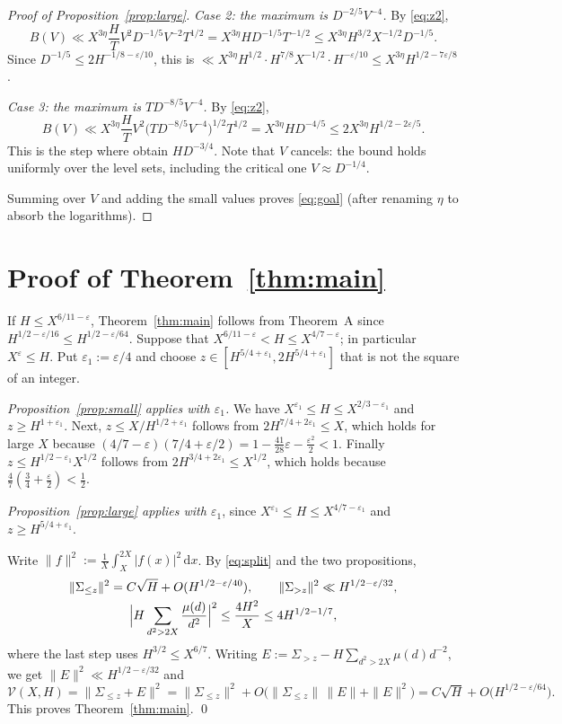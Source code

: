 \documentclass[11pt]{amsart}
\theoremstyle{remark}
\newcommand{\eps}{\varepsilon}
\newcommand{\dd}{\,\mathrm{d}}
\begin{document}
\begin{proof}[Proof of Proposition~\ref{prop:large}]
\emph{Case 2: the maximum is $D^{-2/5}V^{-4}$.}  By \eqref{eq:z2},
\[
  B(V)\ll X^{3\eta}\frac HT V^2D^{-1/5}V^{-2}T^{1/2}=X^{3\eta}HD^{-1/5}T^{-1/2}
  \le X^{3\eta}H^{3/2}X^{-1/2}D^{-1/5}.
\]
Since $D^{-1/5}\le2H^{-1/8-\eps/10}$, this is
$\ll X^{3\eta}H^{1/2}\cdot H^{7/8}X^{-1/2}\cdot H^{-\eps/10}\le X^{3\eta}H^{1/2-7\eps/8}$.

\emph{Case 3: the maximum is $TD^{-8/5}V^{-4}$.}  By \eqref{eq:z2},
\[
  B(V)\ll X^{3\eta}\frac HTV^2\bigl(TD^{-8/5}V^{-4}\bigr)^{1/2}T^{1/2}=X^{3\eta}HD^{-4/5}\le 2X^{3\eta}H^{1/2-2\eps/5}.
\]
This is the step where \cite{GMRR} obtain $HD^{-3/4}$.  Note that $V$ cancels:
the bound holds uniformly over the level sets, including the critical one
$V\approx D^{-1/4}$.

Summing over $V$ and adding the small values proves \eqref{eq:goal} (after
renaming $\eta$ to absorb the logarithms).
\end{proof}

\section{Proof of Theorem~\ref{thm:main}}

If $H\le X^{6/11-\eps}$, Theorem~\ref{thm:main} follows from Theorem~A since
$H^{1/2-\eps/16}\le H^{1/2-\eps/64}$.  Suppose that
$X^{6/11-\eps}<H\le X^{4/7-\eps}$; in particular $X^{\eps}\le H$.  Put $\eps_1:=\eps/4$
and choose $z\in[H^{5/4+\eps_1},2H^{5/4+\eps_1}]$ that is not the square of an integer.

\emph{Proposition~\ref{prop:small} applies with $\eps_1$.}  We have $X^{\eps_1}\le H\le X^{2/3-\eps_1}$
and $z\ge H^{1+\eps_1}$.  Next, $z\le X/H^{1/2+\eps_1}$ follows from
$2H^{7/4+2\eps_1}\le X$, which holds for large $X$ because
$(4/7-\eps)(7/4+\eps/2)=1-\tfrac{41}{28}\eps-\tfrac{\eps^2}{2}<1$.  Finally
$z\le H^{1/2-\eps_1}X^{1/2}$ follows from $2H^{3/4+2\eps_1}\le X^{1/2}$, which holds
because $\tfrac47(\tfrac34+\tfrac\eps2)<\tfrac12$.

\emph{Proposition~\ref{prop:large} applies with $\eps_1$}, since $X^{\eps_1}\le H\le X^{4/7-\eps_1}$
and $z\ge H^{5/4+\eps_1}$.

Write $\|f\|^2:=\frac1X\int_X^{2X}|f(x)|^2\dd x$.  By \eqref{eq:split} and the two
propositions,
\begin{gather*}
  \|\Sigma_{\le z}\|^2=C\sqrt H+O(H^{1/2-\eps/40}),\qquad
  \|\Sigma_{>z}\|^2\ll H^{1/2-\eps/32},\\
  \Bigl|H\sum_{d^2>2X}\frac{\mu(d)}{d^2}\Bigr|^2\le\frac{4H^2}{X}\le 4H^{1/2-1/7},
\end{gather*}
where the last step uses $H^{3/2}\le X^{6/7}$.  Writing $E:=\Sigma_{>z}-H\sum_{d^2>2X}\mu(d)d^{-2}$,
we get $\|E\|^2\ll H^{1/2-\eps/32}$ and
\[
  \mathcal V(X,H)=\|\Sigma_{\le z}+E\|^2=\|\Sigma_{\le z}\|^2+O\bigl(\|\Sigma_{\le z}\|\,\|E\|+\|E\|^2\bigr)
  =C\sqrt H+O\bigl(H^{1/2-\eps/64}\bigr).
\]
This proves Theorem~\ref{thm:main}. \qed
\end{document}
